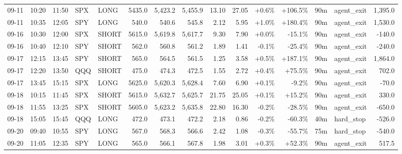 \documentclass[11pt,a4paper,twoside]{article}
\begin{document}
\begin{landscape}
\begin{center}
\begin{longtable}{>{\color{txtmain}}l l l l l r r r r r r r r >{\color{txtmain}}l r}
09-11 & 10:20 & 11:50 & SPX & LONG & 5435.0 & 5,423.2 & 5,455.9 & 13.10 & 27.05 & \textcolor{wingreen}{+0.6\%} & \textcolor{wingreen}{+106.5\%} & 90m & agent\_exit & \textcolor{wingreen}{1,395.0} \\
09-11 & 10:35 & 12:05 & SPY & LONG & 540.0 & 540.6 & 545.8 & 2.12 & 5.95 & \textcolor{wingreen}{+1.0\%} & \textcolor{wingreen}{+180.4\%} & 90m & agent\_exit & \textcolor{wingreen}{1,530.0} \\
09-16 & 10:30 & 12:00 & SPX & SHORT & 5615.0 & 5,619.8 & 5,617.7 & 9.30 & 7.90 & \textcolor{wingreen}{+0.0\%} & \textcolor{lossred}{-15.1\%} & 90m & agent\_exit & \textcolor{lossred}{-140.0} \\
09-16 & 10:40 & 12:10 & SPY & SHORT & 562.0 & 560.8 & 561.2 & 1.89 & 1.41 & \textcolor{lossred}{-0.1\%} & \textcolor{lossred}{-25.4\%} & 90m & agent\_exit & \textcolor{lossred}{-240.0} \\
09-17 & 12:15 & 13:45 & SPY & SHORT & 565.0 & 564.5 & 561.5 & 1.25 & 3.58 & \textcolor{wingreen}{+0.5\%} & \textcolor{wingreen}{+187.1\%} & 90m & agent\_exit & \textcolor{wingreen}{1,864.0} \\
09-17 & 12:20 & 13:50 & QQQ & SHORT & 475.0 & 474.3 & 472.5 & 1.55 & 2.72 & \textcolor{wingreen}{+0.4\%} & \textcolor{wingreen}{+75.5\%} & 90m & agent\_exit & \textcolor{wingreen}{702.0} \\
09-17 & 13:45 & 15:15 & SPX & LONG & 5625.0 & 5,620.3 & 5,628.4 & 7.60 & 6.90 & \textcolor{wingreen}{+0.1\%} & \textcolor{lossred}{-9.2\%} & 90m & agent\_exit & \textcolor{lossred}{-70.0} \\
09-18 & 10:15 & 11:45 & SPX & SHORT & 5615.0 & 5,632.7 & 5,625.7 & 21.75 & 25.05 & \textcolor{wingreen}{+0.1\%} & \textcolor{wingreen}{+15.2\%} & 90m & agent\_exit & \textcolor{wingreen}{330.0} \\
09-18 & 11:55 & 13:25 & SPX & SHORT & 5605.0 & 5,623.2 & 5,635.8 & 22.80 & 16.30 & \textcolor{lossred}{-0.2\%} & \textcolor{lossred}{-28.5\%} & 90m & agent\_exit & \textcolor{lossred}{-650.0} \\
09-18 & 15:05 & 15:45 & QQQ & LONG & 472.0 & 473.1 & 472.2 & 2.18 & 0.86 & \textcolor{lossred}{-0.2\%} & \textcolor{lossred}{-60.3\%} & 40m & hard\_stop & \textcolor{lossred}{-526.0} \\
09-20 & 09:40 & 10:55 & SPY & LONG & 567.0 & 568.3 & 566.6 & 2.42 & 1.08 & \textcolor{lossred}{-0.3\%} & \textcolor{lossred}{-55.7\%} & 75m & hard\_stop & \textcolor{lossred}{-540.0} \\
09-20 & 11:05 & 12:35 & SPY & LONG & 565.0 & 566.1 & 567.8 & 1.98 & 3.01 & \textcolor{wingreen}{+0.3\%} & \textcolor{wingreen}{+52.3\%} & 90m & agent\_exit & \textcolor{wingreen}{517.5} \\

\end{longtable}
\end{center}
\end{landscape}
\end{document}
